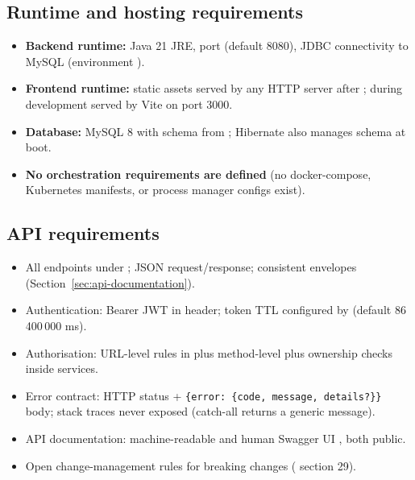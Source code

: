 \subsection{Runtime and hosting requirements}
\begin{itemize}
    \item \textbf{Backend runtime:} Java 21 JRE, port  (default 8080), JDBC connectivity to MySQL (environment ).
    \item \textbf{Frontend runtime:} static assets served by any HTTP server after ; during development served by Vite on port 3000.
    \item \textbf{Database:} MySQL 8 with schema from ; Hibernate  also manages schema at boot.
    \item \textbf{No orchestration requirements are defined} (no docker-compose, Kubernetes manifests, or process manager configs exist).
\end{itemize}

\subsection{API requirements}
\begin{itemize}
    \item All endpoints under ; JSON request/response; consistent envelopes (Section~\ref{sec:api-documentation}).
    \item Authentication: Bearer JWT in  header; token TTL configured by  (default 86\,400\,000 ms).
    \item Authorisation: URL-level rules in  plus method-level  plus ownership checks inside services.
    \item Error contract: HTTP status + \texttt{\{error: \{code, message, details?\}\}} body; stack traces never exposed (catch-all returns a generic message).
    \item API documentation: machine-readable  and human Swagger UI , both public.
    \item Open change-management rules for breaking changes ( section 29).
\end{itemize}

